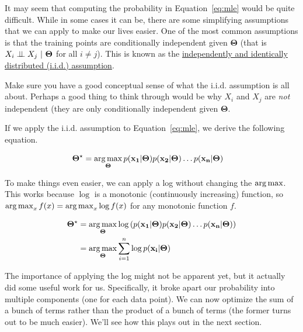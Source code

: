 \documentclass[assignment04_Solutions]{subfiles}
\begin{document}
It may seem that computing the probability in Equation~\ref{eq:mle} would be quite difficult.   While in some cases it can be, there are some simplifying assumptions that we can apply to make our lives easier.  One of the most common assumptions is that the training points are conditionally independent given $\mathbf{\Theta}$ (that is $X_i \perp\!\!\!\perp X_j~|~\mathbf{\Theta}$ for all $i \neq j$).  This is known as the \href{https://en.wikipedia.org/wiki/Independent_and_identically_distributed_random_variables}{independently and identically distributed (i.i.d.) assumption}.

\begin{understandingcheck}
Make sure you have a good conceptual sense of what the i.i.d. assumption is all about.  Perhaps a good thing to think through would be why $X_i$ and $X_j$ are \emph{not} independent (they are only conditionally independent given $\mathbf{\Theta}$.
\end{understandingcheck}

If we apply the i.i.d. assumption to Equation~\ref{eq:mle}, we derive the following equation.

\begin{align}
\mathbf{\Theta^\star} &= \operatorname*{arg\,max}_{\mathbf{\Theta}} p(\mathbf{x_1} |  \mathbf{\Theta}) p(\mathbf{x_2} | \mathbf{\Theta}) \ldots p(\mathbf{x_n} | \mathbf{\Theta}) \label{eq:mleiid}
\end{align}

To make things even easier, we can apply a log without changing the $\operatorname*{arg\,max}$.  This works because $\log$ is a monotonic (continuously increasing) function, so $\operatorname*{arg\,max}_x f(x) = \operatorname*{arg\,max}_x \log  f(x)$ for any monotonic function $f$.


\begin{align}
\mathbf{\Theta^\star} &= \operatorname*{arg\,max}_{\mathbf{\Theta}} \log \left ( p(\mathbf{x_1} |  \mathbf{\Theta}) p(\mathbf{x_2} | \mathbf{\Theta}) \ldots p(\mathbf{x_n} | \mathbf{\Theta})  \right) \nonumber \\
&=  \operatorname*{arg\,max}_{\mathbf{\Theta}} \sum_{i=1}^n \log p(\mathbf{x_i} |  \mathbf{\Theta})  \label{eq:mleiidlog}
\end{align}

The importance of applying the log might not be apparent yet, but it actually did some useful work for us.  Specifically, it broke apart our probability into multiple components (one for each data point).  We can now optimize the sum of a bunch of terms rather than the product  of a bunch of terms (the former turns out to be much easier).  We'll see how this plays out in the next section.
\end{document}
